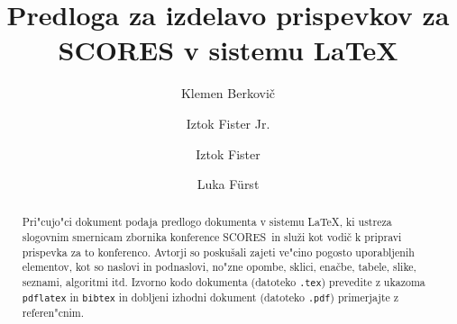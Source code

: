 \documentclass[sigconf,nonacm]{acmart}
\newcommand{\scores}{\textsc{SCORES}}
\begin{document}
\title{Predloga za izdelavo prispevkov za SCORES v sistemu \LaTeX}


\author{Klemen Berkovič}

\author{Iztok Fister Jr.}

\author{Iztok Fister}

\author{Luka F\"{u}rst}

\begin{abstract}
    Pri"cujo"ci dokument podaja predlogo dokumenta v sistemu \LaTeX, ki
    ustreza slogovnim smernicam zbornika konference \scores\ in služi kot
    vodič k pripravi prispevka za to konferenco.  Avtorji so poskušali zajeti
    ve"cino pogosto uporabljenih elementov, kot so naslovi in podnaslovi,
    no"zne opombe, sklici, enačbe, tabele, slike, seznami, algoritmi itd.
    Izvorno kodo dokumenta (datoteko \texttt{.tex}) prevedite z ukazoma
    \texttt{pdflatex} in \texttt{bibtex} in dobljeni izhodni dokument
    (datoteko \texttt{.pdf}) primerjajte z referen"cnim.
\end{abstract}
\end{document}
